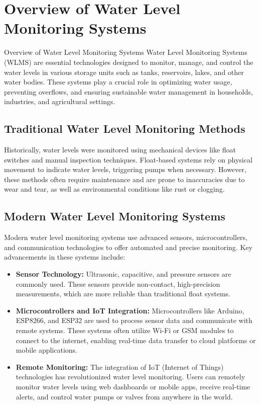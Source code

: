 \section{Overview of Water Level Monitoring Systems}
{\fontsize{12}{14}\selectfont
    Overview of Water Level Monitoring Systems
Water Level Monitoring Systems (WLMS) are essential technologies designed to monitor, manage,
and control the water levels in various storage units such as tanks, reservoirs, lakes, and other water
bodies. These systems play a crucial role in optimizing water usage, preventing overflows, and
ensuring sustainable water management in households, industries, and agricultural settings.\\

    \subsection{Traditional Water Level Monitoring Methods}
    Historically, water levels were monitored using mechanical devices like float switches and manual
    inspection techniques. Float-based systems rely on physical movement to indicate water levels,
    triggering pumps when necessary. However, these methods often require maintenance and are prone
    to inaccuracies due to wear and tear, as well as environmental conditions like rust or clogging.
    \subsection{Modern Water Level Monitoring Systems}
    Modern water level monitoring systems use advanced sensors, microcontrollers, and communication
    technologies to offer automated and precise monitoring. Key advancements in these systems include:
    \begin{itemize}
      \item \textbf{Sensor Technology:} Ultrasonic, capacitive, and pressure sensors are commonly used. These sensors provide non-contact, high-precision measurements, which are more reliable than traditional float systems.
      \item \textbf{Microcontrollers and IoT Integration:} Microcontrollers like Arduino, ESP8266, and ESP32 are used to process sensor data and communicate with remote systems. These systems often utilize Wi-Fi or GSM modules to connect to the internet, enabling real-time data transfer to cloud platforms or mobile applications.
      \item \textbf{Remote Monitoring:} The integration of IoT (Internet of Things) technologies has revolutionized water level monitoring. Users can remotely monitor water levels using web dashboards or mobile apps, receive real-time alerts, and control water pumps or valves from anywhere in the world.
    \end{itemize}
     
}
